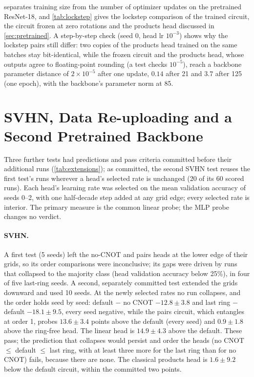  separates training size from the number of optimizer updates on the
pretrained ResNet-18, and \cref{tab:lockstep} gives the lockstep comparison of the trained
circuit, the circuit frozen at zero rotations and the products head discussed in
\cref{sec:pretrained}. A step-by-step check (seed 0, head lr $10^{-3}$) shows why the lockstep
pairs still differ: two copies of the products head trained on the same batches stay
bit-identical, while the frozen circuit and the products head, whose outputs agree to floating-point rounding (a test checks $10^{-5}$), reach a backbone parameter distance of $2\times10^{-5}$ after one update, $0.14$ after
21 and $3.7$ after 125 (one epoch), with the backbone's parameter norm at 85.



\section{SVHN, Data Re-uploading and a Second Pretrained Backbone}
\label{app:extensions}

Three further tests had predictions and pass criteria committed before their additional runs (\cref{tab:extensions}); as committed, the second SVHN test reuses the first test's runs wherever a head's selected rate is unchanged (20 of its 60 scored runs).
Each head's learning rate was selected on the mean validation accuracy of seeds 0--2, with one half-decade
step added at any grid edge; every selected rate is interior. The primary measure is the common linear
probe; the MLP probe changes no verdict.

\paragraph{SVHN.} A first test (5 seeds) left the no-CNOT and pairs heads at the lower edge of their grids,
so its order comparisons were inconclusive; its gaps were driven by runs that collapsed to the majority
class (head validation accuracy below 25\%), in four of five last-ring seeds. A second, separately
committed test extended the grids downward and used 10 seeds. At the newly selected rates no run
collapses, and the order holds seed by seed: default $-$ no CNOT $-12.8\pm3.8$ and last ring $-$ default
$-18.1\pm9.5$, every seed negative, while the pairs circuit, which entangles at order 1, probes
$13.6\pm3.4$ points above the default (every seed) and $0.9\pm1.8$ above the ring-free head. The linear
head is $14.9\pm4.3$ above the default. These pass; the prediction that collapses would persist and
order the heads (no CNOT $\le$ default $\le$ last ring, with at least three more for the last ring than
for no CNOT) fails, because there are none. The classical products head is $1.6\pm9.2$ below the default
circuit, within the committed two points.

